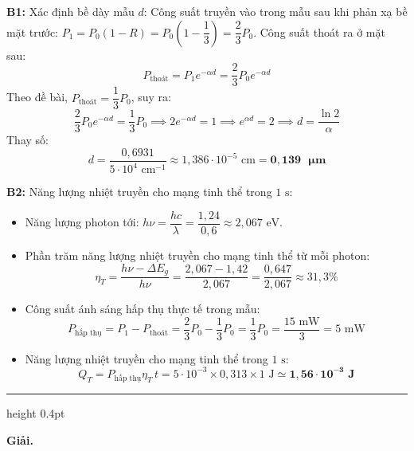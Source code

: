 \documentclass[11pt,a4paper]{article}
\renewcommand{\boldsymbol}[1]{\symbf{#1}}
\let\DeBaiOriginal\DeBai
\renewcommand{\DeBai}[1]{\par\Needspace{5\baselineskip}\DeBaiOriginal{#1}}
\newcommand{\PhanCachBai}{%
  \par\Needspace{7\baselineskip}%
  \addvspace{6pt}%
  {\color{black!40}\hrule height 0.4pt}%
  \nobreak\vspace{7pt}\nobreak
}
\begin{document}
\textbf{B1:} Xác định bề dày mẫu $d$:
Công suất truyền vào trong mẫu sau khi phản xạ bề mặt trước: $P_1 = P_0 (1 - R) = P_0\left(1 - \dfrac{1}{3}\right) = \dfrac{2}{3}P_0$.
Công suất thoát ra ở mặt sau:
\begin{equation*}
    P_{\text{thoát}} = P_1 e^{-\alpha d} = \frac{2}{3} P_0 e^{-\alpha d}
\end{equation*}
Theo đề bài, $P_{\text{thoát}} = \dfrac{1}{3} P_0$, suy ra:
\begin{equation*}
    \frac{2}{3} P_0 e^{-\alpha d} = \frac{1}{3} P_0 \implies 2 e^{-\alpha d} = 1 \implies e^{\alpha d} = 2 \implies d = \frac{\ln 2}{\alpha}
\end{equation*}
Thay số:
\begin{equation*}
    d = \frac{0{,}6931}{5 \cdot 10^4\text{ cm}^{-1}} \approx 1{,}386 \cdot 10^{-5}\text{ cm} = \boldsymbol{0{,}139\text{ }\mu\text{m}}
\end{equation*}

\textbf{B2:} Năng lượng nhiệt truyền cho mạng tinh thể trong $1\text{ s}$:
\begin{itemize}[leftmargin=*, topsep=1pt, itemsep=1pt]
  \item Năng lượng photon tới: $h\nu = \dfrac{h c}{\lambda} = \dfrac{1{,}24}{0{,}6} \approx 2{,}067\text{ eV}$.
  \item Phần trăm năng lượng nhiệt truyền cho mạng tinh thể từ mỗi photon:
  \begin{equation*}
      \eta_T = \frac{h\nu - \Delta E_g}{h\nu} = \frac{2{,}067 - 1{,}42}{2{,}067} = \frac{0{,}647}{2{,}067} \approx 31{,}3\%
  \end{equation*}
  \item Công suất ánh sáng hấp thụ thực tế trong mẫu:
  \begin{equation*}
      P_{\text{hấp thụ}} = P_1 - P_{\text{thoát}} = \frac{2}{3} P_0 - \frac{1}{3} P_0 = \frac{1}{3} P_0 = \frac{15\text{ mW}}{3} = 5\text{ mW}
  \end{equation*}
  \item Năng lượng nhiệt truyền cho mạng tinh thể trong $1\text{ s}$:
  \begin{equation*}
      Q_T=P_{\text{hấp thụ}}\eta_T\,t=5\cdot10^{-3}\times0{,}313\times1\text{ J}\simeq\boldsymbol{1{,}56\cdot10^{-3}\text{ J}}
  \end{equation*}
\end{itemize}

\PhanCachBai


\textbf{Giải.}
\end{document}
